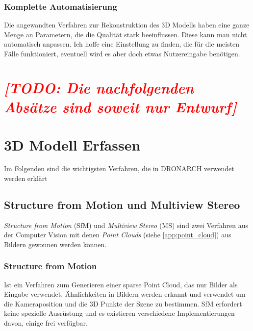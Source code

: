 \documentclass{paper}
\begin{document}
			\subsubsection{Komplette Automatisierung}
				Die angewandten Verfahren zur Rekonstruktion des 3D Modells haben eine ganze Menge an Parametern, die die Qualität stark beeinflussen. Diese kann man nicht automatisch anpassen. Ich hoffe eine Einstellung zu finden, die für die meisten Fälle funktioniert, eventuell wird es aber doch etwas Nutzereingabe benötigen.
					

			
			
			
			
				
	\section*{\textcolor{red}{\emph{[TODO: Die nachfolgenden Absätze sind soweit nur Entwurf]}}}
	
			
	\section{3D Modell Erfassen}\label{scan_methods}
		Im Folgenden sind die wichtigsten Verfahren, die in DRONARCH verwendet werden erklärt
		
		\subsection{Structure from Motion und Multiview Stereo}
			\emph{Structure from Motion} (SfM) und \emph{Multiview Stereo} (MS) sind zwei Verfahren aus der Computer Vision mit denen \emph{Point Clouds} (siehe \autoref{app:point_cloud}) aus Bildern gewonnen werden können.
		
		\subsubsection{Structure from Motion}
			Ist ein Verfahren zum Generieren einer sparse Point Cloud, das nur Bilder als Eingabe verwendet.
			Ähnlichkeiten in Bildern werden erkannt und verwendet um die Kameraposition und die 3D Punkte der Szene zu bestimmen.
			SfM erfordert keine spezielle Ausrüstung und es existieren verschiedene Implementierungen davon, einige frei verfügbar.
		
\end{document}
